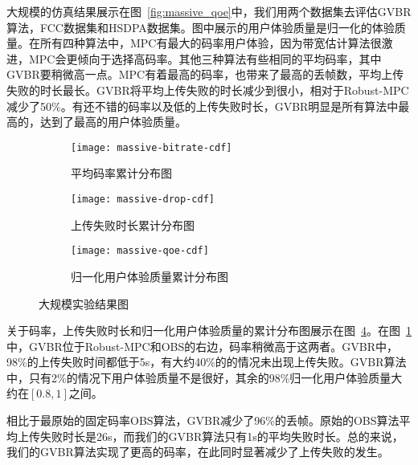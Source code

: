 大规模的仿真结果展示在图~\ref{fig:massive_qoe}中，我们用两个数据集去评估GVBR算法，FCC数据集和HSDPA数据集。图中展示的用户体验质量是归一化的体验质量。在所有四种算法中，MPC有最大的码率用户体验，因为带宽估计算法很激进，MPC会更倾向于选择高码率。其他三种算法有些相同的平均码率，其中GVBR要稍微高一点。MPC有着最高的码率，也带来了最高的丢帧数，平均上传失败的时长最长。GVBR将平均上传失败的时长减少到很小，相对于Robust-MPC减少了50\%。有还不错的码率以及低的上传失败时长，GVBR明显是所有算法中最高的，达到了最高的用户体验质量。

\begin{figure}[htb]
  \centering%
  \begin{subfigure}{0.5\textwidth}
    \texttt{[image: massive-bitrate-cdf]}
    \caption{平均码率累计分布图}
    \label{fig:bitrate_cdf}
  \end{subfigure}%
  \vfill
  \vspace{0.2in}
  \begin{subfigure}{0.5\textwidth}
    \texttt{[image: massive-drop-cdf]}
    \caption{上传失败时长累计分布图}
    \label{fig:drop_cdf}
  \end{subfigure}
  \vfill
  \vspace{0.2in}
  \begin{subfigure}{0.5\textwidth}
    \texttt{[image: massive-qoe-cdf]}
    \caption{归一化用户体验质量累计分布图}
    \label{fig:qoe_cdf}
  \end{subfigure}
  \caption{大规模实验结果图}
  \label{fig:massive_cdf}
\end{figure}

关于码率，上传失败时长和归一化用户体验质量的累计分布图展示在图~\ref{fig:massive_cdf}。在图~\ref{fig:bitrate_cdf}中，GVBR位于Robust-MPC和OBS的右边，码率稍微高于这两者。GVBR中，98\%的上传失败时间都低于5s，有大约40\%的的情况未出现上传失败。GVBR算法中，只有2\%的情况下用户体验质量不是很好，其余的98\%归一化用户体验质量大约在$[0.8,1]$之间。

相比于最原始的固定码率OBS算法，GVBR减少了96\%的丢帧。原始的OBS算法平均上传失败时长是26s，而我们的GVBR算法只有1s的平均失败时长。总的来说，我们的GVBR算法实现了更高的码率，在此同时显著减少了上传失败的发生。